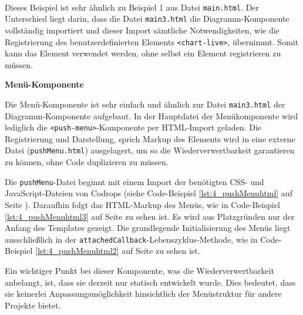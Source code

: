 \begin{enumerate}






 \hfill \\
Dieses Beispiel ist sehr ähnlich zu Beispiel 1 aus Datei \lstinline|main.html|. Der Unterschied liegt darin, dass die Datei \lstinline|main3.html| die Diagramm-Komponente vollständig importiert und dieser Import sämtliche Notwendigkeiten, wie die Registrierung des benutzerdefinierten Elements \lstinline|<chart-live>|, übernimmt. Somit kann das Element verwendet werden, ohne selbst ein Element registrieren zu müssen.
\end{enumerate}

\textbf{Menü-Komponente}

Die Menü-Komponente ist sehr einfach und ähnlich zur Datei \lstinline|main3.html| der Diagramm-Komponente aufgebaut. In der Hauptdatei der Menükomponente wird lediglich die \lstinline|<push-menu>|-Komponente per HTML-Import geladen. Die Registrierung und Darstellung, sprich Markup des Elements wird in eine externe Datei (\lstinline|pushMenu.html|) ausgelagert, um so die Wiederverwertbarkeit garantieren zu können, ohne Code duplizieren zu müssen.

Die \lstinline|pushMenu|-Datei beginnt mit einem Import der benötigten CSS- und JavaScript-Dateien von Codrops (siehe Code-Beispiel \ref{lst:4_pushMenuhtml} auf Seite \pageref{lst:4_pushMenuhtml}). Daraufhin folgt das HTML-Markup des Menüs, wie in Code-Beispiel \ref{lst:4_pushMenuhtml3} auf Seite \pageref{lst:4_pushMenuhtml3} zu sehen ist. Es wird aus Platzgründen nur der Anfang des Templates gezeigt. Die grundlegende Initialisierung des Menüs liegt ausschließlich in der \lstinline|attachedCallback|-Lebenszyklus-Methode, wie in Code-Beispiel \ref{lst:4_pushMenuhtml2} auf Seite \pageref{lst:4_pushMenuhtml2} zu sehen ist.

Ein wichtiger Punkt bei dieser Komponente, was die Wiederverwertbarkeit anbelangt, ist, dass sie derzeit nur statisch entwickelt wurde. Dies bedeutet, dass sie keinerlei Anpassungsmöglichkeit hinsichtlich der Menüstruktur für andere Projekte bietet.

